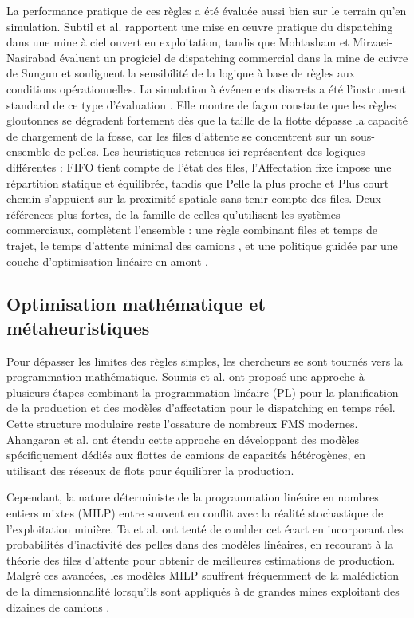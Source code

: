 \documentclass[11pt,a4paper]{article}
\newif\ifrevmarks
\newcommand{\revtag}[1]{\ifrevmarks\textsuperscript{\textcolor{red!70!black}{\scriptsize[#1]}}\fi}
\newcommand{\rev}[2]{\ifrevmarks{\color{revcolor}#2}\revtag{#1}\else#2\fi}
\begin{document}
La performance pratique de ces règles a été évaluée aussi bien sur le terrain qu'en simulation. Subtil et al. \cite{Subtil2011} rapportent une mise en œuvre pratique du dispatching dans une mine à ciel ouvert en exploitation, tandis que Mohtasham et Mirzaei-Nasirabad \cite{MehrnazMohtasham2023} évaluent un progiciel de dispatching commercial dans la mine de cuivre de Sungun et soulignent la sensibilité de la logique à base de règles aux conditions opérationnelles. La simulation à événements discrets a été l'instrument standard de ce type d'évaluation \cite{NecmettinCetin2004, MarceloFioroni2008, Zeng2022, MiladAbolghasemian2020}. Elle montre de façon constante que les règles gloutonnes se dégradent fortement dès que la taille de la flotte dépasse la capacité de chargement de la fosse, car les files d'attente se concentrent sur un sous-ensemble de pelles. \rev{M25, m5, T31}{Les heuristiques retenues ici représentent des logiques différentes : FIFO tient compte de l'état des files, l'Affectation fixe impose une répartition statique et équilibrée, tandis que Pelle la plus proche et Plus court chemin s'appuient sur la proximité spatiale sans tenir compte des files. Deux références plus fortes, de la famille de celles qu'utilisent les systèmes commerciaux, complètent l'ensemble : une règle combinant files et temps de trajet, le temps d'attente minimal des camions \cite{Zeng2022}, et une politique guidée par une couche d'optimisation linéaire en amont \cite{Soumis1989, AmandaSmith2020}.}

\subsection{Optimisation mathématique et métaheuristiques}

Pour dépasser les limites des règles simples, les chercheurs se sont tournés vers la programmation mathématique. Soumis et al. \cite{Soumis1989} ont proposé une approche à plusieurs étapes combinant la programmation linéaire (PL) pour la planification de la production et des modèles d'affectation pour le dispatching en temps réel. Cette structure modulaire reste l'ossature de nombreux FMS modernes. Ahangaran et al. \cite{Ahangaran2012} ont étendu cette approche en développant des modèles spécifiquement dédiés aux flottes de camions de capacités hétérogènes, en utilisant des réseaux de flots pour équilibrer la production.

Cependant, la nature déterministe de la programmation linéaire en nombres entiers mixtes (MILP) entre souvent en conflit avec la réalité stochastique de l'exploitation minière. Ta et al. \cite{ChungTa2013} ont tenté de combler cet écart en incorporant des probabilités d'inactivité des pelles dans des modèles linéaires, en recourant à la théorie des files d'attente pour obtenir de meilleures estimations de production. Malgré ces avancées, les modèles MILP souffrent fréquemment de la malédiction de la dimensionnalité lorsqu'ils sont appliqués à de grandes mines exploitant des dizaines de camions \cite{AmandaSmith2020, ZhongxinWang2022}.
\end{document}
